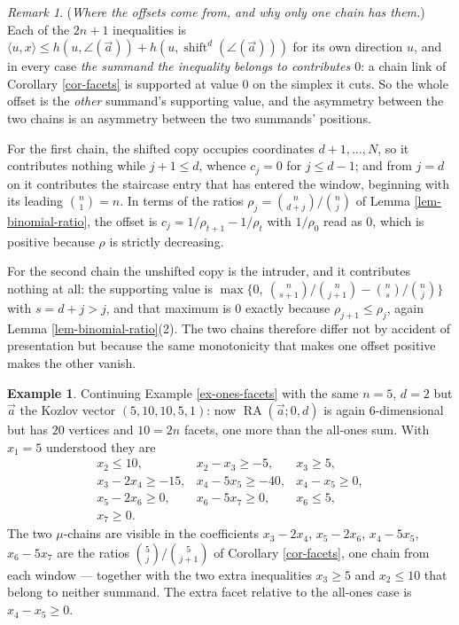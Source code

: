 \documentclass[11pt, a4paper, abstract=yes]{scrartcl}
\theoremstyle{definition}
\newtheorem{mexample}[definition]{Example}
\theoremstyle{remark}
\newtheorem{remark}[definition]{Remark}
\theoremstyle{plain}
\newcommand{\shift}{\operatorname{shift}}
\newcommand{\rasimp}{\angle}
\newcommand{\RA}{\operatorname{RA}}
\begin{document}
\begin{remark}
(\emph{Where the offsets come from, and why only one chain has them.}) Each of the \(2n+1\) inequalities is
\(\langle u,x\rangle\le h(u,\rasimp(\vec a))+h(u,\shift^d(\rasimp(\vec a)))\) for its own direction
\(u\), and in every case \emph{the summand the inequality belongs to contributes \(0\)}: a chain link of
Corollary \ref{cor-facets} is supported at value \(0\) on the simplex it cuts. So the whole offset is
the \emph{other} summand's supporting value, and the asymmetry between the two chains is an asymmetry
between the two summands' positions.

For the first chain, the shifted copy occupies coordinates \(d+1,\dots,N\), so it contributes nothing
while \(j+1\le d\), whence \(c_j=0\) for \(j\le d-1\); and from \(j=d\) on it contributes the
staircase entry that has entered the window, beginning with its leading \(\binom n1=n\). In terms of
the ratios \(\rho_j=\binom n{d+j}\big/\binom nj\) of Lemma \ref{lem-binomial-ratio}, the offset is
\(c_j=1/\rho_{t+1}-1/\rho_t\) with \(1/\rho_0\) read as \(0\), which is positive because \(\rho\) is
strictly decreasing.

For the second chain the unshifted copy is the intruder, and it contributes nothing at all: the
supporting value is \(\max\lbrace0,\ \binom n{s+1}/\binom n{j+1}-\binom ns/\binom nj\rbrace\) with
\(s=d+j>j\), and that maximum is \(0\) exactly because \(\rho_{j+1}\le\rho_j\), again
Lemma \ref{lem-binomial-ratio}(2). The two chains therefore differ not by accident of presentation but
because the same monotonicity that makes one offset positive makes the other vanish.
\label{rem-hrep2-offsets}
\end{remark}

\begin{mexample}
Continuing Example \ref{ex-ones-facets} with the same \(n=5\), \(d=2\) but \(\vec a\) the Kozlov vector
\((5,10,10,5,1)\): now \(\RA(\vec a;0,d)\) is again \(6\)-dimensional but has \(20\) vertices
and \(10=2n\)
facets, one more than the all-ones sum. With \(x_1=5\) understood they are
\[
\begin{array}{lll}
 x_2\le 10, & x_2-x_3\ge-5, & x_3\ge 5,\\
 x_3-2x_4\ge-15, & x_4-5x_5\ge-40, & x_4-x_5\ge 0,\\
 x_5-2x_6\ge 0, & x_6-5x_7\ge 0, & x_6\le 5,\\
 x_7\ge 0 . & &
\end{array}
\]
The two \(\mu\)-chains are visible in the coefficients \(x_3-2x_4\), \(x_5-2x_6\),
\(x_4-5x_5\), \(x_6-5x_7\) are the ratios \(\binom5j/\binom5{j+1}\) of Corollary \ref{cor-facets}, one
chain from each window --- together with the two extra inequalities \(x_3\ge5\) and \(x_2\le10\)
that belong to neither summand. The extra facet relative to the all-ones case is \(x_4-x_5\ge0\).
\label{ex-kozlov-facets}
\end{mexample}
\end{document}

